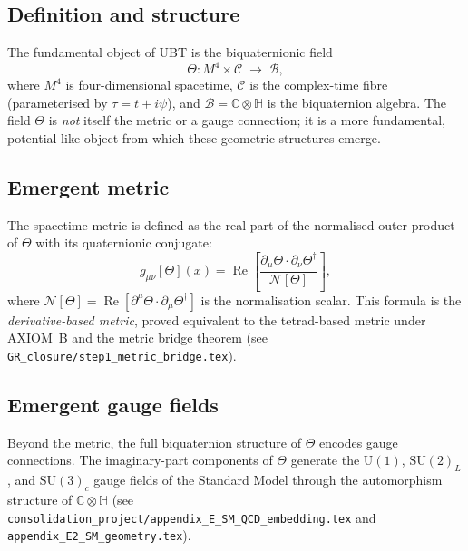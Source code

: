 \documentclass[12pt]{article}
\theoremstyle{definition}
\theoremstyle{remark}
\begin{document}
\subsection{Definition and structure}

The fundamental object of UBT is the biquaternionic field
\begin{equation}
  \Theta: M^4 \times \mathcal{C} \;\longrightarrow\; \mathcal{B},
\end{equation}
where $M^4$ is four-dimensional spacetime, $\mathcal{C}$ is the complex-time
fibre (parameterised by $\tau = t + i\psi$), and $\mathcal{B} = \mathbb{C}\otimes\mathbb{H}$
is the biquaternion algebra.  The field $\Theta$ is \emph{not} itself the
metric or a gauge connection; it is a more fundamental, potential-like object
from which these geometric structures emerge.

\subsection{Emergent metric}

The spacetime metric is defined as the real part of the normalised outer
product of $\Theta$ with its quaternionic conjugate:
\begin{equation}
  g_{\mu\nu}[\Theta](x)
  = \operatorname{Re}\!\left[
      \frac{\partial_\mu\Theta\cdot\partial_\nu\Theta^\dagger}
           {\mathcal{N}[\Theta]}
    \right],
  \label{eq:emergent_metric}
\end{equation}
where $\mathcal{N}[\Theta] = \operatorname{Re}[\partial^\mu\Theta\cdot\partial_\mu\Theta^\dagger]$
is the normalisation scalar.  This formula is the \emph{derivative-based
metric}, proved equivalent to the tetrad-based metric under AXIOM~B and the
metric bridge theorem (see \texttt{GR\_closure/step1\_metric\_bridge.tex}).

\subsection{Emergent gauge fields}

Beyond the metric, the full biquaternion structure of $\Theta$ encodes gauge
connections.  The imaginary-part components of $\Theta$ generate the $\mathrm{U}(1)$,
$\mathrm{SU}(2)_L$, and $\mathrm{SU}(3)_c$ gauge fields of the Standard Model
through the automorphism structure of $\mathbb{C}\otimes\mathbb{H}$ (see
\texttt{consolidation\_project/appendix\_E\_SM\_QCD\_embedding.tex} and
\texttt{appendix\_E2\_SM\_geometry.tex}).
\end{document}
